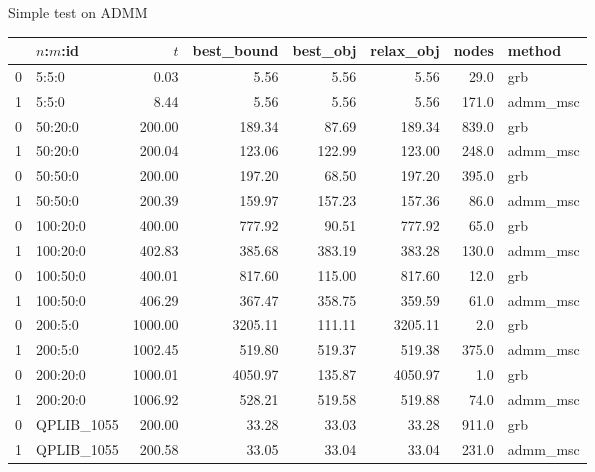 \begin{frame}{Simple test on ADMM}
  \begin{tabular}{llrrrrrl}
    \toprule
    {} & $n$:$m$:id  & $t$     & best\_bound & best\_obj & relax\_obj & nodes & method    \\
    \midrule
    0  & 5:5:0       & 0.03    & 5.56        & 5.56      & 5.56       & 29.0  & grb       \\
    1  & 5:5:0       & 8.44    & 5.56        & 5.56      & 5.56       & 171.0 & admm\_msc \\
    0  & 50:20:0     & 200.00  & 189.34      & 87.69     & 189.34     & 839.0 & grb       \\
    1  & 50:20:0     & 200.04  & 123.06      & 122.99    & 123.00     & 248.0 & admm\_msc \\
    0  & 50:50:0     & 200.00  & 197.20      & 68.50     & 197.20     & 395.0 & grb       \\
    1  & 50:50:0     & 200.39  & 159.97      & 157.23    & 157.36     & 86.0  & admm\_msc \\
    0  & 100:20:0    & 400.00  & 777.92      & 90.51     & 777.92     & 65.0  & grb       \\
    1  & 100:20:0    & 402.83  & 385.68      & 383.19    & 383.28     & 130.0 & admm\_msc \\
    0  & 100:50:0    & 400.01  & 817.60      & 115.00    & 817.60     & 12.0  & grb       \\
    1  & 100:50:0    & 406.29  & 367.47      & 358.75    & 359.59     & 61.0  & admm\_msc \\
    0  & 200:5:0     & 1000.00 & 3205.11     & 111.11    & 3205.11    & 2.0   & grb       \\
    1  & 200:5:0     & 1002.45 & 519.80      & 519.37    & 519.38     & 375.0 & admm\_msc \\
    0  & 200:20:0    & 1000.01 & 4050.97     & 135.87    & 4050.97    & 1.0   & grb       \\
    1  & 200:20:0    & 1006.92 & 528.21      & 519.58    & 519.88     & 74.0  & admm\_msc \\
    0  & QPLIB\_1055 & 200.00  & 33.28       & 33.03     & 33.28      & 911.0 & grb       \\
    1  & QPLIB\_1055 & 200.58  & 33.05       & 33.04     & 33.04      & 231.0 & admm\_msc \\
    \bottomrule
  \end{tabular}
\end{frame}

